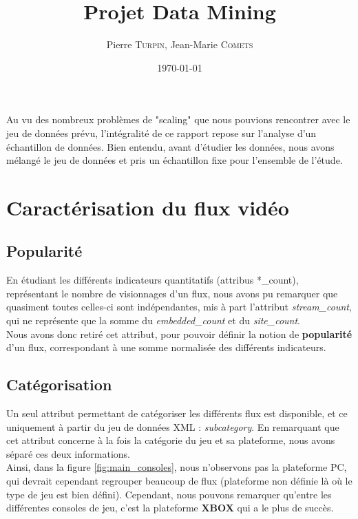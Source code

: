 \documentclass[11pt, a4paper, titlepage]{scrartcl}
\title{Projet Data Mining}
\author{Pierre \textsc{Turpin}, Jean-Marie \textsc{Comets}}
\date{\today}
\begin{document}
\maketitle
\tableofcontents
\newpage

Au vu des nombreux problèmes de "scaling" que nous pouvions rencontrer
avec le jeu de données prévu, l'intégralité de ce rapport repose sur
l'analyse d'un échantillon de données. Bien entendu, avant d'étudier les
données, nous avons mélangé le jeu de données et pris un échantillon fixe pour
l'ensemble de l'étude.

\section{Caractérisation du flux vidéo}

\subsection{Popularité}

En étudiant les différents indicateurs quantitatifs (attribus *\_count),
représentant le nombre de visionnages d'un flux, nous avons pu remarquer que
quasiment toutes celles-ci sont indépendantes, mis à part l'attribut
\textit{stream\_count}, qui ne représente que la somme du
\textit{embedded\_count} et du \textit{site\_count}. \\

Nous avons donc retiré cet attribut, pour pouvoir définir la notion de
\textbf{popularité} d'un flux, correspondant à une somme normalisée des
différents indicateurs. \\

\subsection{Catégorisation}

Un seul attribut permettant de catégoriser les différents flux est disponible,
et ce uniquement à partir du jeu de données XML : \textit{subcategory}. En
remarquant que cet attribut concerne à la fois la catégorie du jeu et sa
plateforme, nous avons séparé ces deux informations. \\

Ainsi, dans la figure \ref{fig:main_consoles}, nous n'observons pas la
plateforme PC, qui devrait cependant regrouper beaucoup de flux (plateforme non
définie là où le type de jeu est bien défini). Cependant, nous pouvons
remarquer qu'entre les différentes consoles de jeu, c'est la plateforme \textbf{XBOX}
qui a le plus de succès. \\
\end{document}

